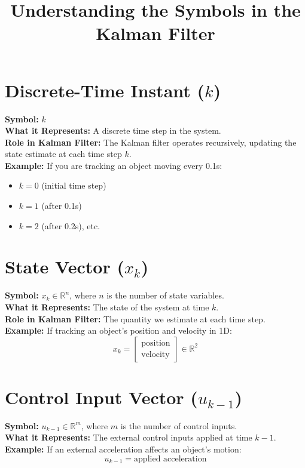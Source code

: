 \documentclass{article}
\title{Understanding the Symbols in the Kalman Filter}
\author{}
\date{}
\begin{document}
\maketitle

\section{Discrete-Time Instant ($k$)}
\textbf{Symbol:} $k$  \\
\textbf{What it Represents:} A discrete time step in the system.  \\
\textbf{Role in Kalman Filter:} The Kalman filter operates recursively, updating the state estimate at each time step $k$.  \\
\textbf{Example:} If you are tracking an object moving every 0.1s:
\begin{itemize}
    \item $k = 0$ (initial time step)
    \item $k = 1$ (after 0.1s)
    \item $k = 2$ (after 0.2s), etc.
\end{itemize}

\section{State Vector ($x_k$)}
\textbf{Symbol:} $x_k \in \mathbb{R}^{n}$, where $n$ is the number of state variables.  \\
\textbf{What it Represents:} The state of the system at time $k$.  \\
\textbf{Role in Kalman Filter:} The quantity we estimate at each time step.  \\
\textbf{Example:} If tracking an object's position and velocity in 1D:
\[
    x_k = \begin{bmatrix} \text{position} \\ \text{velocity} \end{bmatrix} \in \mathbb{R}^{2}
\]

\section{Control Input Vector ($u_{k-1}$)}
\textbf{Symbol:} $u_{k-1} \in \mathbb{R}^{m}$, where $m$ is the number of control inputs.  \\
\textbf{What it Represents:} The external control inputs applied at time $k-1$.  \\
\textbf{Example:} If an external acceleration affects an object's motion:
\[
    u_{k-1} = \text{applied acceleration}
\]
\end{document}
